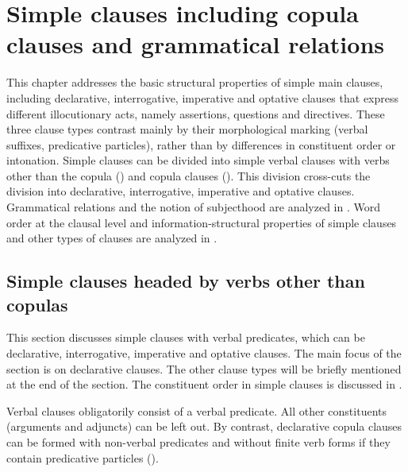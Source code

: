 \chapter{Simple clauses including copula clauses and grammatical relations}
\label{cpt:Simpleclauses}

This chapter addresses the basic structural properties of simple main clauses, including declarative, interrogative, imperative and optative clauses that express different illocutionary acts, namely assertions, questions and directives. These three clause types contrast mainly by their morphological marking (verbal suffixes, predicative particles), rather than by differences in constituent order or intonation. Simple clauses can be divided into simple verbal clauses with verbs other than the copula () and copula clauses (). This division cross-cuts the division into declarative, interrogative, imperative and optative clauses. Grammatical relations and the notion of subjecthood are analyzed in . Word order at the clausal level and information-structural properties of simple clauses and other types of clauses are analyzed in . 



\section{Simple clauses headed by verbs other than copulas}
\label{sec:Simple clauses headed by verbs other than copulae}

This section discusses simple clauses with verbal predicates, which can be declarative, interrogative, imperative and optative clauses. The main focus of the section is on declarative clauses. The other clause types will be briefly mentioned at the end of the section. The constituent order in simple clauses is discussed in .

Verbal clauses obligatorily consist of a verbal predicate. All other constituents (arguments and adjuncts) can be left out. By contrast, declarative copula clauses can be formed with non-verbal predicates and without finite verb forms if they contain predicative particles ().  

